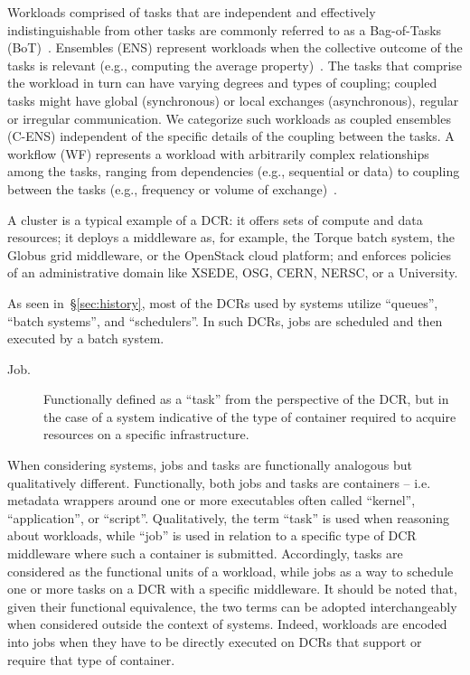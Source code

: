 \documentclass{sig-alternate}
\begin{document}
Workloads comprised of tasks that are independent and effectively
indistinguishable from other tasks are commonly referred to as a Bag-of-Tasks
(BoT)~\cite{da2003trading,cirne2003running}. Ensembles (ENS) represent workloads
when the collective outcome of the tasks is relevant (e.g., computing the
average property)~\cite{raicu2008many}. The tasks that comprise the workload in
turn can have varying degrees and types of coupling; coupled tasks might have
global (synchronous) or local exchanges (asynchronous), regular or irregular
communication. We categorize such workloads as coupled ensembles (C-ENS)
independent of the specific details of the coupling between the tasks. A
workflow (WF) represents a workload with arbitrarily complex relationships among
the tasks, ranging from dependencies (e.g., sequential or data) to coupling
between the tasks (e.g., frequency or volume of exchange)~\cite{taylor2014}.


A cluster is a typical example of a DCR: it offers sets of compute and data
resources; it deploys a middleware as, for example, the Torque batch system, the
Globus grid middleware, or the OpenStack cloud platform; and enforces policies
of an administrative domain like XSEDE, OSG, CERN, NERSC, or a University.

As seen in~\S\ref{sec:history}, most of the DCRs used by \pilotjob systems
utilize ``queues'', ``batch systems'', and ``schedulers''. In such DCRs, jobs
are scheduled and then executed by a batch system.

\begin{description}

\item[Job.] Functionally defined as a ``task'' from the perspective of the DCR,
but in the case of a \pilotjob system indicative of the type of container
required to acquire resources on a specific infrastructure.

\end{description}

When considering \pilotjob systems, jobs and tasks are functionally analogous
but qualitatively different. Functionally, both jobs and tasks are containers --
i.e. metadata wrappers around one or more executables often called ``kernel'',
``application'', or ``script''. Qualitatively, the term ``task'' is used when
reasoning about workloads, while ``job'' is used in relation to a specific type
of DCR middleware where such a container is submitted. Accordingly, tasks are
considered as the functional units of a workload, while jobs as a way to
schedule one or more tasks on a DCR with a specific middleware. It should be
noted that, given their functional equivalence, the two terms can be adopted
interchangeably when considered outside the context of \pilotjob systems.
Indeed, workloads are encoded into jobs when they have to be directly executed
on DCRs that support or require that type of container.
\end{document}
